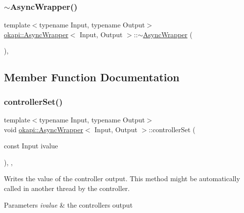 \subsubsection{\texorpdfstring{$\sim$AsyncWrapper()}{~AsyncWrapper()}}
{\footnotesize\ttfamily template$<$typename Input, typename Output$>$ \\
\mbox{\hyperlink{classokapi_1_1AsyncWrapper}{okapi\+::\+Async\+Wrapper}}$<$ Input, Output $>$\+::$\sim$\mbox{\hyperlink{classokapi_1_1AsyncWrapper}{Async\+Wrapper}} (\begin{DoxyParamCaption}{ }\end{DoxyParamCaption})\hspace{0.3cm}{\ttfamily [inline]}, {\ttfamily [override]}}



\subsection{Member Function Documentation}
\mbox{\label{classokapi_1_1AsyncWrapper_aec6d1a4214bad2151bee23dc5e8076e7}} 
\subsubsection{\texorpdfstring{controllerSet()}{controllerSet()}}
{\footnotesize\ttfamily template$<$typename Input, typename Output$>$ \\
void \mbox{\hyperlink{classokapi_1_1AsyncWrapper}{okapi\+::\+Async\+Wrapper}}$<$ Input, Output $>$\+::controller\+Set (\begin{DoxyParamCaption}\item[{const Input}]{ivalue }\end{DoxyParamCaption})\hspace{0.3cm}{\ttfamily [inline]}, {\ttfamily [override]}, {\ttfamily [virtual]}}

Writes the value of the controller output. This method might be automatically called in another thread by the controller.


\begin{DoxyParams}{Parameters}
{\em ivalue} & the controller\textquotesingle{}s output \\
\hline
\end{DoxyParams}


